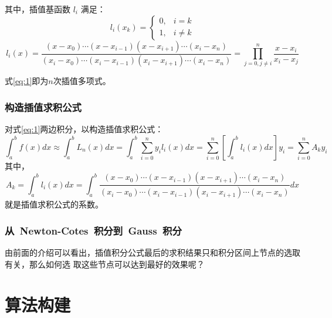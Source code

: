 \documentclass[UTF8, 12pt, a4paper]{ctexart}
\begin{document}
\begin{spacing}{1.5}
其中，插值基函数 $l_i$ 满足：
\begin{equation*}
l_i(x_k) = \left\{
\begin{array}{rcl}
0,& i = k\\
1,& i \neq k
\end{array} \right.
\end{equation*}
\begin{equation}
l_{i}(x) = \dfrac{ (x-x_0)\cdots(x-x_{i-1})(x-x_{i+1})\cdots(x_i-x_n) }{ (x_i-x_0)\cdots(x_i-x_{i-1})(x_i-x_{i+1})\cdots(x_i-x_n) } = \prod _{j=0,j \neq i}^{n} \dfrac{x-x_i}{x_i-x_j}
\end{equation}

式\eqref{eq:1}即为$n$次插值多项式。

\section{构造插值求积公式}

对式\eqref{eq:1}两边积分，以构造插值求积公式：
\begin{equation}
\boxed{
\int _a^b f(x)dx \approx \int _a^b L_n(x)dx = \int_a^b \sum \limits _{i=0}^n y_il_i(x)dx = \sum_{i=0}^n\left[ \int_a^b l_i (x) dx \right]y_i = \sum \limits _{i=0}^{n}A_{k}y_i
}
\end{equation}
其中，
\begin{equation}
A_k = \int_a^b l_i (x) dx = \int_a^b \dfrac{ (x-x_0)\cdots(x-x_{i-1})(x-x_{i+1})\cdots(x_i-x_n) }{ (x_i-x_0)\cdots(x_i-x_{i-1})(x_i-x_{i+1})\cdots(x_i-x_n) }dx
\end{equation}
就是插值求积公式的系数。
\section{从~Newton-Cotes~积分到~Gauss~积分}
由前面的介绍可以看出，插值积分公式最后的求积结果只和积分区间上节点的选取有关，那么如何选
取这些节点可以达到最好的效果呢？

\part{算法构建}

\end{spacing}
\end{document}
